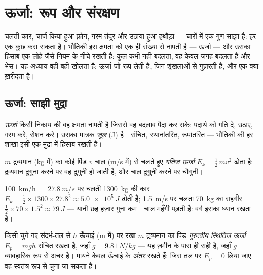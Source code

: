 \chapter{ऊर्जा: रूप और संरक्षण}\label{ch:g10:energy-conservation}

चलती कार, चार्ज किया हुआ फ़ोन, गरम तंदूर और उठाया हुआ हथौड़ा --- चारों
में एक गुण साझा है: हर एक कुछ करा सकता है। भौतिकी इस क्षमता को एक ही
संख्या से नापती है --- ऊर्जा --- और उसका हिसाब एक लोहे जैसे नियम
के नीचे रखती है: कुल कभी नहीं बदलता, वह केवल जगह बदलता है और भेस।
यह अध्याय वही बही खोलता है: ऊर्जा जो रूप लेती है, जिन शृंखलाओं से
गुज़रती है, और एक  क्या ख़रीदता है।

\section{ऊर्जा: साझी मुद्रा}

\begin{definition}[ऊर्जा और जूल]\label{def:g10:energy-conservation:energy}
\emph{ऊर्जा} किसी निकाय की वह क्षमता नापती है जिससे वह
बदलाव पैदा कर सके: पदार्थ को गति दे, उठाए, गरम करे, रोशन करे। उसका
मात्रक \emph{जूल} (\unit{J}) है। संचित, स्थानांतरित,
रूपांतरित --- भौतिकी की हर शाखा इसी एक मुद्रा में हिसाब रखती है।
\end{definition}

\begin{definition}[गतिज ऊर्जा]\label{def:g10:energy-conservation:kinetic}
$m$ द्रव्यमान (\unit{kg} में) का कोई पिंड $v$ चाल (\unit{m/s} में) से चलते
हुए \emph{गतिज ऊर्जा} $E_k = \tfrac12\, m v^2$ ढोता है: द्रव्यमान दुगुना
करने पर वह दुगुनी हो जाती है, और चाल दुगुनी करने पर चौगुनी।
\end{definition}

\begin{example}[कार बनाम राहगीर]\label{ex:g10:energy-conservation:kinetic}
\qty{100}{km/h} $= \qty{27.8}{m/s}$ पर चलती \qty{1300}{kg} की कार $E_k = \tfrac12 \times 1300 \times 27.8^2 \approx \qty{5.0e5}{J}$ ढोती है; \qty{1.5}{m/s} पर चलता
\qty{70}{kg} का राहगीर $\tfrac12 \times 70 \times 1.5^2 \approx \qty{79}{J}$ --- यानी छह हज़ार गुना कम। चाल महँगी पड़ती है:
वर्ग इसका ध्यान रखता है।
\end{example}

\begin{definition}[गुरुत्वीय स्थितिज ऊर्जा]\label{def:g10:energy-conservation:potential}
किसी चुने गए संदर्भ-तल से $h$ ऊँचाई (\unit{m} में) पर रखा $m$
द्रव्यमान का पिंड \emph{गुरुत्वीय स्थितिज ऊर्जा} $E_p = m g h$ संचित रखता है, जहाँ $g = \qty{9.81}{N/kg}$ --- यह ज़मीन के पास
ही सही है, जहाँ $g$ व्यावहारिक रूप से अचर है। मायने केवल ऊँचाई के
\emph{अंतर} रखते हैं: जिस तल पर $E_p = 0$ लिया जाए वह स्वतंत्र रूप से चुना
जा सकता है।
\end{definition}

